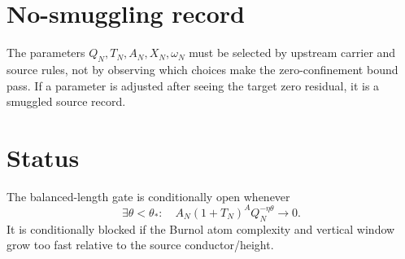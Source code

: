 \documentclass[11pt]{article}
\begin{document}
\section{No-smuggling record}
The parameters $Q_N,T_N,A_N,X_N,\omega_N$ must be selected by upstream carrier and source rules, not by observing which choices make the zero-confinement bound pass.  If a parameter is adjusted after seeing the target zero residual, it is a smuggled source record.

\section{Status}
The balanced-length gate is conditionally open whenever
\[
\exists \theta<\theta_*:
\quad
A_N(1+T_N)^AQ_N^{-\eta\theta}\to0.
\]
It is conditionally blocked if the Burnol atom complexity and vertical window grow too fast relative to the source conductor/height.
\end{document}
